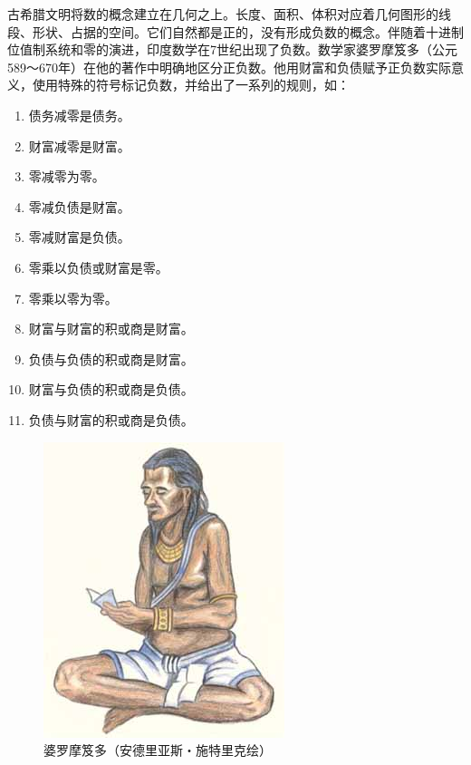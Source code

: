 \documentclass[b5paper]{ctexart}
\begin{document}
古希腊文明将数的概念建立在几何之上。长度、面积、体积对应着几何图形的线段、形状、占据的空间。它们自然都是正的，没有形成负数的概念。伴随着十进制位值制系统和零的演进，印度数学在7世纪出现了负数。数学家婆罗摩笈多（公元589～670年）在他的著作中明确地区分正负数。他用财富和负债赋予正负数实际意义，使用特殊的符号标记负数，并给出了一系列的规则，如\cite{Rogers-2011}：

\begin{multicols}{2}
\begin{enumerate}[1)]
\item 债务减零是债务。
\item 财富减零是财富。
\item 零减零为零。
\item 零减负债是财富。
\item 零减财富是负债。
\item 零乘以负债或财富是零。
\item 零乘以零为零。
\item 财富与财富的积或商是财富。
\item 负债与负债的积或商是财富。
\item 财富与负债的积或商是负债。
\item 负债与财富的积或商是负债。
\end{enumerate}
\end{multicols}

\begin{figure}[htbp]
 \centering
 \includegraphics[scale=0.3]{img/Brahmagupta}
 \caption{婆罗摩笈多（安德里亚斯・施特里克绘）}
 \label{fig:yinyang}
\end{figure}
\end{document}
